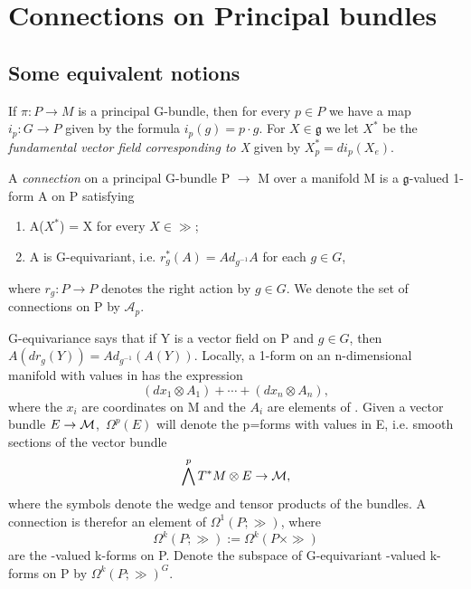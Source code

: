 \section{Connections on Principal bundles}
\subsection{Some equivalent notions}
If $\pi: P \rightarrow M$ is a principal G-bundle, then for every $p \in P$ we have a map
$i_{p}: G \rightarrow P$ given by the formula $i_{p}(g) = p \cdot g$. For $X \in \mathfrak{g}$ we let $X^*$ be
the \textit{fundamental vector field corresponding to X} given by $X_{p}^* = di_{p}(X_e)$.
\begin{definition}
 A \textit{connection} on a principal G-bundle P $\rightarrow$ M over a manifold M is a $\mathfrak{g}$-valued 1-form
 A on P satisfying
 \begin{enumerate}
  \item A($X^*$) = X for every $X \in \gg$;
  \item A is G-equivariant, i.e. $r^{*}_{g}(A) = Ad_{g^{-1}}A$ for each $g \in G$,
 \end{enumerate}
where $r_{g}: P \rightarrow P$ denotes the right action by $g \in G$. We denote the set of connections on P by
$\mathcal{A}_{p}$.
\end{definition}
  G-equivariance says that if Y is a vector field on P and $g \in G$, then $A\left(dr_{g}\left(Y\right) \right) = 
  Ad_{g^{-1}}(A(Y)).$ Locally, a 1-form on an n-dimensional manifold \M with values in \gg has the expression
  \begin{equation*}
   (dx_1 \otimes A_1) + \cdots + (dx_n \otimes A_n),
  \end{equation*}
where the $x_i$ are coordinates on M and the $A_i$ are elements of \gg. Given a vector bundle $E \rightarrow \mathcal{M}$,\
$\Omega^{p}(E)$ will denote the p=forms with values in E, i.e. smooth sections of the vector bundle 
\begin{equation*}
 \bigwedge^p T^{*}M \otimes E \rightarrow \mathcal{M},
\end{equation*}
where the symbols denote the wedge and tensor products of the bundles. A connection is therefor an element of $\Omega^1(P;
\gg)$, where 
\begin{equation*}
 \Omega^k(P;\gg) := \Omega^k(P \times \gg)
\end{equation*}
are the \gg-valued k-forms on P. Denote the subspace of G-equivariant \gg-valued k-forms on P by 
$\Omega^k(P;\gg)^G$.


